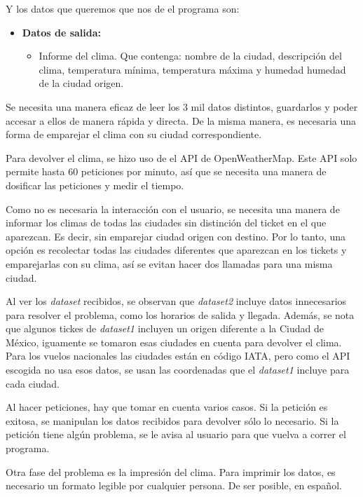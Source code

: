 \documentclass[]{article}
\begin{document}
Y los datos que queremos que nos de el programa son:
\begin{itemize}
	\item \textbf{Datos de salida:}
	\begin{itemize}
		\item Informe del clima. Que contenga: nombre de la ciudad, descripción del clima, temperatura mínima, temperatura máxima y humedad humedad de la ciudad origen.
	\end{itemize}
\end{itemize}

Se necesita una manera eficaz de leer los 3 mil datos distintos, guardarlos y 
poder accesar a ellos de manera rápida y directa. De la misma manera, es 
necesaria una forma de emparejar el clima con su ciudad correspondiente.

Para devolver el clima, se hizo uso de el API de OpenWeatherMap. Este API
solo permite hasta 60 peticiones por minuto, así que se necesita una 
manera de dosificar las peticiones y medir el tiempo.

Como no es necesaria la interacción con el usuario, se necesita 
una manera de informar los climas de todas las ciudades sin distinción del 
ticket en el que aparezcan. Es decir, sin emparejar ciudad origen con 
destino. Por lo tanto, una opción es recolectar todas las ciudades 
diferentes que aparezcan en los tickets y emparejarlas con su clima, así 
se evitan hacer dos llamadas para una misma ciudad.

Al ver los \emph{dataset} recibidos, se observan que \emph{dataset2} incluye 
datos innecesarios para resolver el problema, como los horarios de salida y 
llegada. Además, se nota que algunos tickes de \emph{dataset1} incluyen un 
origen diferente a la Ciudad de México, iguamente se tomaron esas ciudades 
en cuenta para devolver el clima. Para los vuelos nacionales las ciudades están 
en código IATA, pero como el API escogida no usa esos datos, se usan las 
coordenadas que el \emph{dataset1} incluye para cada ciudad. 

Al hacer peticiones, hay que tomar en cuenta varios casos. Si la petición 
es exitosa, se manipulan los datos recibidos para devolver sólo lo 
necesario. Si la petición tiene algún problema, se le avisa al usuario para 
que vuelva a correr el programa. 

Otra fase del problema es la impresión del clima. Para imprimir los datos, es 
necesario un formato legible por cualquier persona. De ser posible, en 
español.
\end{document}
